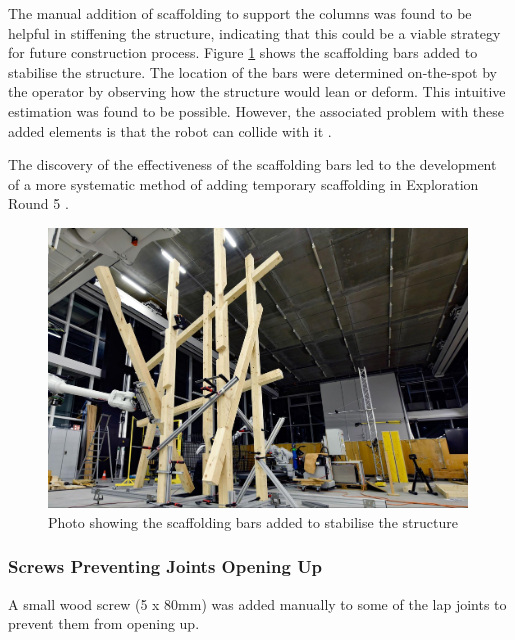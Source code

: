 The manual addition of scaffolding to support the columns was found to be helpful in stiffening the structure, indicating that this could be a viable strategy for future construction process. Figure \ref{fig:scaffolding-bars-2} shows the scaffolding bars added to stabilise the structure. The location of the bars were determined on-the-spot by the operator by observing how the structure would lean or deform. This intuitive estimation was found to be possible. However, the associated problem with these added elements is that the robot can collide with it .

The discovery of the effectiveness of the scaffolding bars led to the development of a more systematic method of adding temporary scaffolding in Exploration Round 5 .

\begin{figure}[!h]
    \centering
    \includegraphics[width=0.99\textwidth]{images/6b/img06.jpg}
    \caption{Photo showing the scaffolding bars added to stabilise the structure}
    \label{fig:scaffolding-bars-2}
\end{figure}

\subsubsection{Screws Preventing Joints Opening Up}
\label{subsubsection:exploration-3-screws-preventing-joints-opening-up}

A small wood screw (5 x 80mm) was added manually to some of the lap joints to prevent them from opening up.

